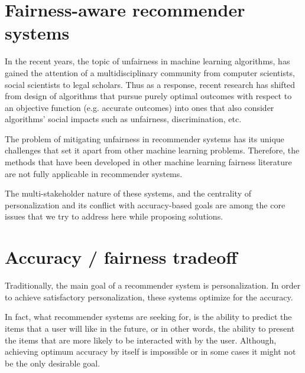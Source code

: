     

\section{Fairness-aware recommender systems}

In the recent years, the topic of unfairness in machine learning algorithms, has gained the attention of a multidisciplinary community from computer scientists, social scientists to legal scholars. Thus as a response, recent research has shifted from design of algorithms that pursue purely optimal outcomes with respect to an objective function (e.g. accurate outcomes) into ones that also consider algorithms' social impacts such as unfairness, discrimination, etc.

The problem of mitigating unfairness in recommender systems has its unique challenges that set it apart from other machine learning problems. Therefore, the methods that have been developed in other machine learning fairness literature are not fully applicable in recommender systems.

The multi-stakeholder nature of these systems, and the centrality of personalization and its conflict with accuracy-based goals are among the core issues that we try to address here while proposing solutions.

\section{Accuracy / fairness tradeoff}

Traditionally, the main goal of a recommender system is personalization. In order to achieve satisfactory personalization, these systems optimize for the accuracy.

In fact, what recommender systems are seeking for, is the ability to predict the items that a user will like in the future, or in other words, the ability to present the items that are more likely to be interacted with by the user. Although, achieving optimum accuracy by itself is impossible or in some cases it might not be the only desirable goal.

